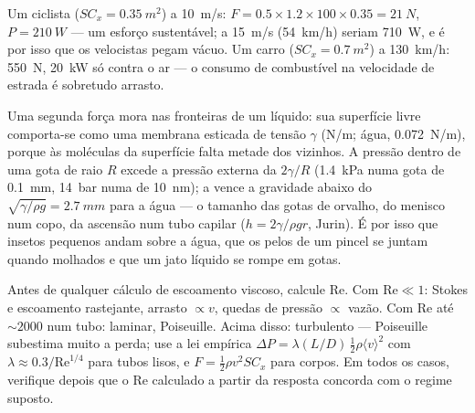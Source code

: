 \begin{example}\label{ex:b2:viscous-flows:cyclist}
Um ciclista ($SC_x = \qty{0.35}{m^2}$) a \qty{10}{m/s}: $F = 0.5 \times 1.2 \times 100
\times 0.35 = \qty{21}{N}$, $P = \qty{210}{W}$ --- um esforço sustentável; a \qty{15}{m/s}
(\qty{54}{km/h}) seriam \qty{710}{W}, e é por isso que os velocistas pegam vácuo.
Um carro ($SC_x = \qty{0.7}{m^2}$) a \qty{130}{km/h}: \qty{550}{N}, \qty{20}{kW} só contra
o ar --- o consumo de combustível na velocidade de estrada é sobretudo arrasto.
\end{example}

\begin{remark}\label{rem:b2:viscous-flows:capillarity}
Uma segunda força mora nas fronteiras de um líquido: sua superfície livre
comporta-se como uma membrana esticada de tensão $\gamma$ (\unit{N/m}; água,
\qty{0.072}{N/m}), porque às moléculas da superfície falta metade dos vizinhos.
A pressão dentro de uma gota de raio $R$ excede a pressão externa
da \emph{} $2\gamma/R$ (\qty{1.4}{kPa} numa gota de \qty{0.1}{mm},
\qty{14}{bar} numa de \qty{10}{nm}); a  vence a gravidade abaixo
do \emph{} $\sqrt{\gamma/\rho g} = \qty{2.7}{mm}$ para a água ---
o tamanho das gotas de orvalho, do menisco num copo, da ascensão num
tubo capilar ($h = 2\gamma/\rho gr$, Jurin). É por isso que insetos pequenos andam
sobre a água, que os pelos de um pincel se juntam quando molhados e que um
jato líquido se rompe em gotas.
\end{remark}

\begin{method}\label{met:b2:viscous-flows:regime}
Antes de qualquer cálculo de escoamento viscoso, calcule $\mathrm{Re}$. Com $\mathrm{Re} \ll 1$:
Stokes e escoamento rastejante, arrasto $\propto v$, quedas de pressão $\propto$ vazão.
Com $\mathrm{Re}$ até $\sim\!2000$ num tubo: laminar, Poiseuille. Acima disso:
turbulento --- Poiseuille subestima muito a perda; use a
lei empírica $\Delta P = \lambda(L/D)\,\tfrac12\rho\langle v\rangle^2$ com $\lambda
\approx 0.3/\mathrm{Re}^{1/4}$ para tubos lisos, e $F = \tfrac12\rho v^2SC_x$ para
corpos. Em todos os casos, verifique depois que o $\mathrm{Re}$ calculado
a partir da resposta concorda com o regime suposto.
\end{method}

